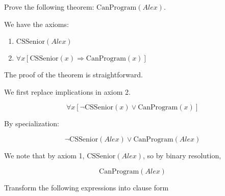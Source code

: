 \documentclass[11pt,largemargins, anonymous]{homework}
\begin{document}
Prove the following theorem: \( \mathrm{CanProgram}(Alex) \).

We have the axioms:

\begin{enumerate}
    \item \( \mathrm{CSSenior}(Alex) \)
    \item \( \forall x [\mathrm{CSSenior}(x) \Rightarrow \mathrm{CanProgram}(x)] \)
\end{enumerate}

The proof of the theorem is straightforward.

We first replace implications in axiom 2.

\[ \forall x [\neg \mathrm{CSSenior}(x) \lor \mathrm{CanProgram}(x)] \]

By specialization:

\[ \neg \mathrm{CSSenior}(Alex) \lor \mathrm{CanProgram}(Alex) \]

We note that by axiom 1, \( \mathrm{CSSenior}(Alex) \), so by binary resolution,

\[ \mathrm{CanProgram}(Alex) \]

\question

Transform the following expressions into clause form
\end{document}
